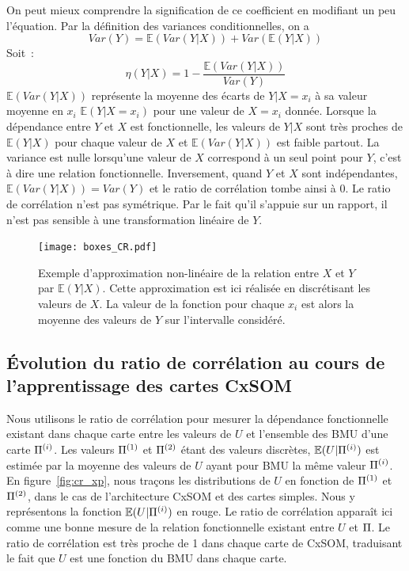 \documentclass[../main]{subfiles}
\begin{document}
On peut mieux comprendre la signification de ce coefficient en modifiant un peu l'équation.
Par la définition des variances conditionnelles, on a 
$$Var(Y) = \mathbb{E}(Var(Y|X)) + Var(\mathbb{E}(Y|X))$$
Soit~:
$$\eta(Y|X) = 1 - \frac{\mathbb{E}(Var(Y|X))}{Var(Y)}$$
$\mathbb{E}(Var(Y|X))$ représente la moyenne des écarts de $Y|X=x_i$ à sa valeur moyenne en $x_i$ $\mathbb{E}(Y|X=x_i)$ pour une valeur de $X = x_i$ donnée. Lorsque la dépendance entre $Y$ et $X$ est fonctionnelle, les valeurs de $Y|X$ sont très proches de $\mathbb{E}(Y|X)$ pour chaque valeur de $X$ et $\mathbb{E}(Var(Y|X))$ est faible partout. La variance est nulle lorsqu'une valeur de $X$ correspond à un seul point pour $Y$, c'est à dire une relation fonctionnelle. Inversement, quand $Y$ et $X$ sont indépendantes, $\mathbb{E}(Var(Y|X)) = Var(Y)$ et le ratio de corrélation tombe ainsi à 0.
Le ratio de corrélation n'est pas symétrique. Par le fait qu'il s'appuie sur un rapport, il n'est pas sensible à une transformation linéaire de $Y$.

\begin{figure}
    \centering
    \texttt{[image: boxes\_CR.pdf]}
    \caption{Exemple d'approximation non-linéaire de la relation entre $X$ et $Y$ par $\mathbb{E}(Y|X)$. Cette approximation est ici réalisée en discrétisant les valeurs de $X$. La valeur de la fonction pour chaque $x_i$ est alors la moyenne des valeurs de $Y$ sur l'intervalle considéré.}
\end{figure}

\subsection{\'Evolution du ratio de corrélation au cours de l'apprentissage des cartes CxSOM}

Nous utilisons le ratio de corrélation pour mesurer la dépendance fonctionnelle existant dans chaque carte entre les valeurs de $U$ et l'ensemble des BMU d'une carte $\Pi^{({i})}$.
Les valeurs $\Pi^{({1})}$ et $\Pi^{({2})}$ étant des valeurs discrètes, $\mathbb{E}(U|\Pi^{({i})})$ est estimée par la moyenne des valeurs de $U$ ayant pour BMU la même valeur $\Pi^{({i})}$. 
En figure~\ref{fig:cr_xp}, nous traçons les distributions de $U$ en fonction de $\Pi^{({1})}$ et $\Pi^{({2})}$, dans le cas de l'architecture CxSOM et des cartes simples. Nous y représentons la fonction $\mathbb{E}(U|\Pi^{({i})})$ en rouge.
Le ratio de corrélation apparaît ici comme une bonne mesure de la relation fonctionnelle existant entre $U$ et $\Pi$. Le ratio de corrélation est très proche de 1 dans chaque carte de CxSOM, traduisant le fait que $U$ est une fonction du BMU dans chaque carte.
\end{document}
